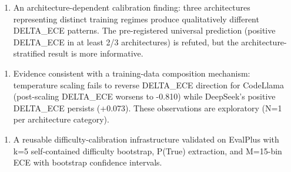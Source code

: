 \begin{enumerate}
\item An architecture-dependent calibration finding: three architectures representing distinct training regimes produce qualitatively different DELTA\_ECE patterns. The pre-registered universal prediction (positive DELTA\_ECE in at least 2/3 architectures) is refuted, but the architecture-stratified result is more informative.
\end{enumerate}

\begin{enumerate}
\item Evidence consistent with a training-data composition mechanism: temperature scaling fails to reverse DELTA\_ECE direction for CodeLlama (post-scaling DELTA\_ECE worsens to -0.810) while DeepSeek's positive DELTA\_ECE persists (+0.073). These observations are exploratory (N=1 per architecture category).
\end{enumerate}

\begin{enumerate}
\item A reusable difficulty-calibration infrastructure validated on EvalPlus with k=5 self-contained difficulty bootstrap, P(True) extraction, and M=15-bin ECE with bootstrap confidence intervals.
\end{enumerate}
